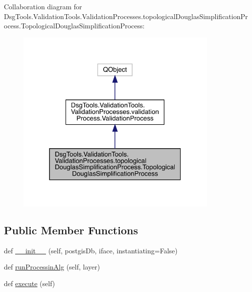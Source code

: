 Collaboration diagram for Dsg\+Tools.\+Validation\+Tools.\+Validation\+Processes.\+topological\+Douglas\+Simplification\+Process.\+Topological\+Douglas\+Simplification\+Process\+:
\nopagebreak
\begin{figure}[H]
\begin{center}
\leavevmode
\includegraphics[width=281pt]{class_dsg_tools_1_1_validation_tools_1_1_validation_processes_1_1topological_douglas_simplificata14ead0b0a44077801ef6e344e460d09}
\end{center}
\end{figure}
\subsection*{Public Member Functions}
\begin{DoxyCompactItemize}
\item 
def \mbox{\hyperlink{class_dsg_tools_1_1_validation_tools_1_1_validation_processes_1_1topological_douglas_simplificat7eb46ba2812d315c08230afeb95e4b17_aba0bbed4b6c69a7f26787ac15f6c5f13}{\+\_\+\+\_\+init\+\_\+\+\_\+}} (self, postgis\+Db, iface, instantiating=False)
\item 
def \mbox{\hyperlink{class_dsg_tools_1_1_validation_tools_1_1_validation_processes_1_1topological_douglas_simplificat7eb46ba2812d315c08230afeb95e4b17_af32407c7dd723c00d3c41eac869576c4}{run\+Processin\+Alg}} (self, layer)
\item 
def \mbox{\hyperlink{class_dsg_tools_1_1_validation_tools_1_1_validation_processes_1_1topological_douglas_simplificat7eb46ba2812d315c08230afeb95e4b17_a33202769765e55e12d6eb607179fce08}{execute}} (self)
\end{DoxyCompactItemize}
